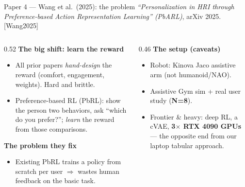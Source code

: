 \documentclass[aspectratio=169,10pt]{beamer}
\newcommand{\refnum}[1]{{\footnotesize\color{giuaccent}[#1]}}
\begin{document}
\begin{frame}{Paper 4 --- Wang et al.\ (2025): the problem}
  \footnotesize \emph{``Personalization in HRI through Preference-based Action Representation Learning'' (PbARL)}, arXiv 2025. \refnum{Wang2025}
  \vspace{0.4em}
  \begin{columns}[T]
    \begin{column}{0.52\textwidth}
      \textbf{The big shift: learn the reward}
      \begin{itemize}\footnotesize
        \item All prior papers \emph{hand-design} the reward (comfort, engagement, weights). Hard and brittle.
        \item \alert{Preference-based RL (PbRL)}: show the person two behaviors, ask ``which do you prefer?''; \emph{learn} the reward from those comparisons.
      \end{itemize}
      \textbf{The problem they fix}
      \begin{itemize}\footnotesize
        \item Existing PbRL trains a policy \alert{from scratch} per user $\Rightarrow$ wastes human feedback on the basic task.
      \end{itemize}
    \end{column}
    \begin{column}{0.46\textwidth}
      \textbf{The setup (caveats)}
      \begin{itemize}\footnotesize
        \item Robot: \alert{Kinova Jaco} assistive arm (not humanoid/NAO).
        \item Assistive Gym sim + real user study (\textbf{N=8}).
        \item \alert{Frontier \& heavy}: deep RL, a cVAE, \textbf{3$\times$ RTX 4090 GPUs} --- the opposite end from our laptop tabular approach.
      \end{itemize}
    \end{column}
  \end{columns}
\end{frame}
\end{document}
